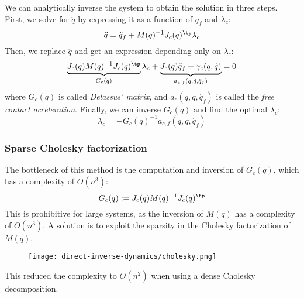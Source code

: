 We can analytically inverse the system to obtain the solution in three steps. First, we solve for $\ddot{q}$ by expressing it as a function of $\ddot{q}_f$ and $\lambda_c$:
\begin{equation*}
    \ddot{q} = \ddot{q}_f + M(q)^{-1}J_c(q)^\tp\lambda_c
\end{equation*}
Then, we replace $\ddot{q}$ and get an expression depending only on $\lambda_c$:
\begin{equation*}
    \underbrace{
        J_c(q)M(q)^{-1}J_c(q)^\tp
    }_{G_c(q)}\lambda_c
    + \underbrace{
        J_c(q)\ddot{q}_f + \gamma_c(q, \dot{q})
    }_{a_{c, f}(q, \dot{q}, \ddot{q}_f)}
    = 0
\end{equation*}
where $G_c(q)$ is called \emph{Delassus' matrix}, and $a_c(q, \dot{q}, \ddot{q}_f)$ is called the \emph{free contact acceleration}. Finally, we can inverse $G_c(q)$ and find the optimal $\lambda_c$:
\begin{equation*}
    \lambda_c = -G_c(q)^{-1}a_{c, f}(q, \dot{q}, \ddot{q}_f)
\end{equation*}

\subsubsection{Sparse Cholesky factorization}
The bottleneck of this method is the computation and inversion of $G_c(q)$, which has a complexity of $O(n^3)$:
\begin{equation*}
    G_c(q) := J_c(q)M(q)^{-1}J_c(q)^\tp
\end{equation*}
This is prohibitive for large systems, as the inversion of $M(q)$ has a complexity of $O(n^3)$. A solution is to exploit the sparsity in the Cholesky factorization of $M(q)$.
\begin{figure}[H]
    \centering
    \texttt{[image: direct-inverse-dynamics/cholesky.png]}
\end{figure}
This reduced the complexity to $O(n^2)$ when using a dense Cholesky decomposition.

